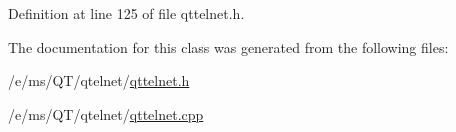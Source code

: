 Definition at line 125 of file qttelnet.h.



The documentation for this class was generated from the following files:\begin{DoxyCompactItemize}
\item 
/e/ms/QT/qtelnet/\hyperlink{qttelnet_8h}{qttelnet.h}\item 
/e/ms/QT/qtelnet/\hyperlink{qttelnet_8cpp}{qttelnet.cpp}\end{DoxyCompactItemize}
